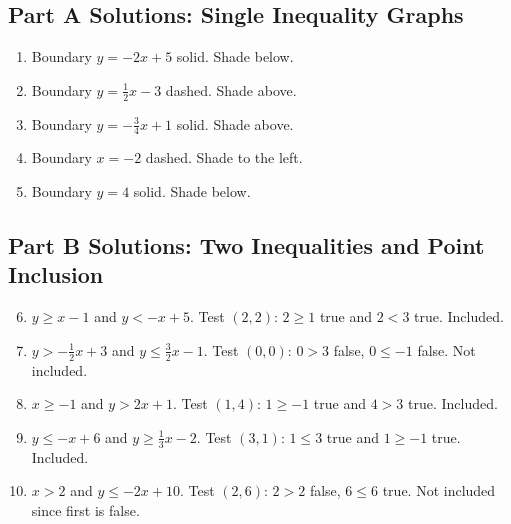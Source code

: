 \documentclass[12pt]{article}
\begin{document}
\subsection*{Part A Solutions: Single Inequality Graphs}
\begin{enumerate}
  \item Boundary \(y=-2x+5\) solid. Shade below.
  \item Boundary \(y=\tfrac12 x-3\) dashed. Shade above.
  \item Boundary \(y=-\tfrac34 x+1\) solid. Shade above.
  \item Boundary \(x=-2\) dashed. Shade to the left.
  \item Boundary \(y=4\) solid. Shade below.
\end{enumerate}

\subsection*{Part B Solutions: Two Inequalities and Point Inclusion}
\begin{enumerate}
  \setcounter{enumi}{5}
  \item \(y\ge x-1\) and \(y<-x+5\). Test \((2,2)\): \(2\ge1\) true and \(2<3\) true. Included.
  \item \(y>-\tfrac12x+3\) and \(y\le \tfrac32x-1\). Test \((0,0)\): \(0>3\) false, \(0\le-1\) false. Not included.
  \item \(x\ge -1\) and \(y>2x+1\). Test \((1,4)\): \(1\ge-1\) true and \(4>3\) true. Included.
  \item \(y\le -x+6\) and \(y\ge \tfrac13 x-2\). Test \((3,1)\): \(1\le3\) true and \(1\ge -1\) true. Included.
  \item \(x>2\) and \(y\le -2x+10\). Test \((2,6)\): \(2>2\) false, \(6\le6\) true. Not included since first is false.
\end{enumerate}
\end{document}
